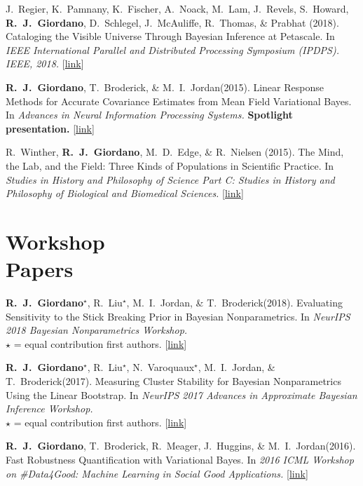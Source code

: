 \documentclass[margin,line]{res}
\newcommand{\me}{\textbf{R.~J.~Giordano}\xspace}
\newcommand{\mestar}{\textbf{R.~J.~Giordano}$^{\star}$\xspace}
\newcommand{\tamara}{T.~Broderick\xspace}
\newcommand{\mike}{M.~I.~Jordan\xspace}
\newcommand{\runjing}{R.~Liu\xspace}
\newcommand{\paperref}[1]{[\href{#1}{link}]}
\newcommand{\paperref}[1]{}
\begin{document}
\begin{resume}
J.~Regier, K.~Pamnany, K.~Fischer, A.~Noack, M.~Lam, J.~Revels, S.~Howard, \me,
D.~Schlegel, J.~McAuliffe, R.~Thomas, \& Prabhat (2018).  Cataloging the Visible
Universe Through Bayesian Inference at Petascale.  In \emph{IEEE International
Parallel and Distributed Processing Symposium (IPDPS). IEEE, 2018.}
\paperref{https://arxiv.org/abs/1801.10277}

\me, \tamara, \& \mike (2015). Linear Response Methods for Accurate Covariance
Estimates from Mean Field Variational Bayes. In \emph{Advances in Neural
Information Processing Systems.}
\textbf{Spotlight presentation.}
\paperref{https://arxiv.org/abs/1506.04088}

R.~Winther, \me, M.~D.~Edge, \& R.~Nielsen (2015).  The Mind, the Lab, and the
Field: Three Kinds of Populations in Scientific Practice.  In \emph{Studies in
History and Philosophy of Science Part C: Studies in History and Philosophy of
Biological and Biomedical Sciences.}
\paperref{https://doi.org/10.1016/j.shpsc.2015.01.009}


\section{\sc Workshop \\ Papers}

\mestar, \runjing{}$^\star$, \mike, \& \tamara (2018).
Evaluating Sensitivity to the Stick Breaking Prior in Bayesian Nonparametrics.
In \emph{NeurIPS 2018 Bayesian Nonparametrics Workshop.}\\
$\star$ = equal contribution first authors.
\paperref{https://arxiv.org/abs/1810.06587}

\mestar, \runjing{}$^\star$, N.~Varoquaux$^\star$, \mike, \& \tamara (2017).
Measuring Cluster Stability for Bayesian Nonparametrics Using the Linear Bootstrap.
In \emph{NeurIPS 2017 Advances in Approximate Bayesian Inference Workshop.}\\
$\star$ = equal contribution first authors.
\paperref{https://arxiv.org/abs/1712.01435}

\me, \tamara, R.~Meager, J.~Huggins, \& \mike (2016). Fast Robustness
Quantification with Variational Bayes. In \emph{2016 ICML Workshop on
\#Data4Good: Machine Learning in Social Good Applications.}
\paperref{https://arxiv.org/abs/1606.07153}




\end{resume}
\end{document}
